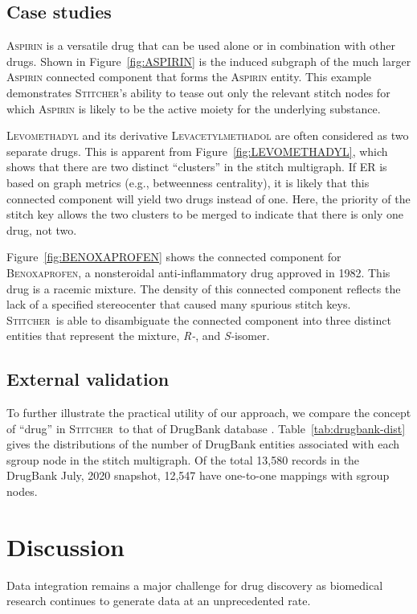 \documentclass{bmcart}
\newcommand\st{\textsc{Stitcher}}
\begin{document}
\subsection*{Case studies}
\textsc{Aspirin} is a versatile drug that can be used alone or in
combination with other drugs. Shown in Figure~\ref{fig:ASPIRIN} is the
induced subgraph of the much larger \textsc{Aspirin} connected component that
forms the \textsc{Aspirin} entity. This example demonstrates \st's
ability to tease out only the relevant stitch nodes for which
\textsc{Aspirin} is likely to be the active moiety for the underlying
substance. 

\textsc{Levomethadyl} and its derivative \textsc{Levacetylmethadol} are
often considered as two separate drugs. This is apparent from
Figure~\ref{fig:LEVOMETHADYL}, which shows that there are two distinct
``clusters'' in the stitch multigraph. If ER is based on
graph metrics (e.g., betweenness centrality), it is likely that this
connected component will yield two drugs instead of one. Here, the
priority of the stitch key allows the two clusters to be merged to
indicate that there is only one drug, not two.

Figure~\ref{fig:BENOXAPROFEN} shows the connected component for
\textsc{Benoxaprofen}, a nonsteroidal anti-inflammatory drug approved in
1982. This drug is a racemic mixture. The density of this connected
component reflects the lack of a specified stereocenter that
caused many spurious stitch keys. \st\ is able to disambiguate the
connected component into three distinct entities that represent the
mixture, \emph{R-}, and \emph{S-}isomer.

\subsection*{External validation}
To further illustrate the practical utility of our approach, we
compare the concept of ``drug'' in \st\ to that of DrugBank
database \cite{wishart2018}. 
Table~\ref{tab:drugbank-dist} gives the distributions of the number of
DrugBank entities associated with each sgroup node in the stitch
multigraph. Of the total 13,580 records in the DrugBank July, 2020
snapshot, 12,547 have one-to-one mappings with sgroup nodes. 

\section*{Discussion}
Data integration remains a major challenge for drug discovery as
biomedical research continues to generate data at an unprecedented
rate. 
\end{document}
